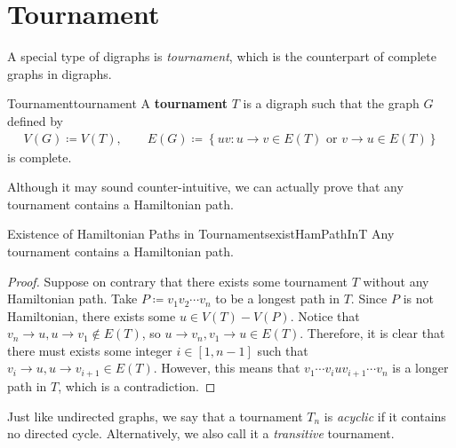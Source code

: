 \documentclass[math]{amznotes}
\theoremstyle{remark}
\newcommand{\0}{\mathbf{0}}
\newcommand{\1}{\mathbf{1}}
\begin{document}
\section{Tournament}
A special type of digraphs is \textit{tournament}, which is the counterpart of complete graphs in digraphs.
\begin{dfnbox}{Tournament}{tournament}
    A {\color{red} \textbf{tournament}} $T$ is a digraph such that the graph $G$ defined by 
    \begin{align*}
        V(G) \coloneqq V(T), \qquad E(G) \coloneqq \left\{uv \colon u \to v \in E(T) \textrm{ or } v \to u \in E(T)\right\}
    \end{align*}
    is complete.
\end{dfnbox}
Although it may sound counter-intuitive, we can actually prove that any tournament contains a Hamiltonian path.
\begin{probox}{Existence of Hamiltonian Paths in Tournaments}{existHamPathInT}
    Any tournament contains a Hamiltonian path.
    \tcblower
    \begin{proof}
        Suppose on contrary that there exists some tournament $T$ without any Hamiltonian path. Take $P \coloneqq v_1v_2\cdots v_n$ to be a longest path in $T$. Since $P$ is not Hamiltonian, there exists some $u \in V(T) - V(P)$. Notice that $v_n \to u, u \to v_1 \notin E(T)$, so $u \to v_n, v_1 \to u \in E(T)$. Therefore, it is clear that there must exists some integer $i \in [1, n - 1]$ such that $v_i \to u, u \to v_{i + 1} \in E(T)$. However, this means that $v_1\cdots v_iuv_{i + 1}\cdots v_n$ is a longer path in $T$, which is a contradiction.
    \end{proof}
\end{probox}
Just like undirected graphs, we say that a tournament $T_n$ is \textit{acyclic} if it contains no directed cycle. Alternatively, we also call it a \textit{transitive} tournament.
\end{document}
